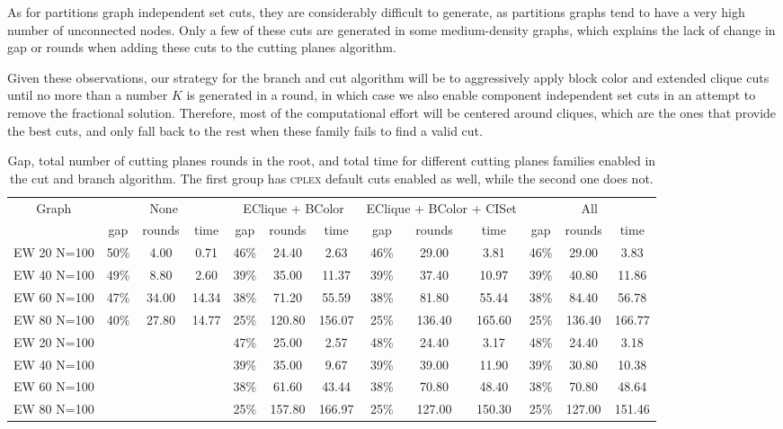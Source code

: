 As for partitions graph independent set cuts, they are considerably difficult to generate, as partitions graphs tend to have a very high number of unconnected nodes. Only a few of these cuts are generated in some medium-density graphs, which explains the lack of change in gap or rounds when adding these cuts to the cutting planes algorithm.

Given these observations, our strategy for the branch and cut algorithm will be to aggressively apply block color and extended clique cuts until no more than a number $K$ is generated in a round, in which case we also enable component independent set cuts in an attempt to remove the fractional solution. Therefore, most of the computational effort will be centered around cliques, which are the ones that provide the best cuts, and only fall back to the rest when these family fails to find a valid cut.

\begin{sidewaystable}[h]
\centering

\begin{tabular}{|c|ccc|ccc|ccc|ccc|}
\hline
\multicolumn{1}{|c|}{Graph} & \multicolumn{3}{|c|}{None} & \multicolumn{3}{|c|}{EClique + BColor} & \multicolumn{3}{|c|}{EClique + BColor + CISet} & \multicolumn{3}{|c|}{All}
\\
 & gap & rounds & time & gap & rounds & time & gap & rounds & time & gap & rounds & time
\\
\hline
EW 20 N=100 & 50\% & 4.00 & 0.71 & 46\% & 24.40 & 2.63 & 46\% & 29.00 & 3.81 & 46\% & 29.00 & 3.83
\\
EW 40 N=100 & 49\% & 8.80 & 2.60 & 39\% & 35.00 & 11.37 & 39\% & 37.40 & 10.97 &39\% & 40.80 & 11.86
\\
EW 60 N=100 &47\% & 34.00 & 14.34 &38\% & 71.20 & 55.59 &38\% & 81.80 & 55.44 &38\% & 84.40 & 56.78
\\
EW 80 N=100 &40\% & 27.80 & 14.77 &25\% & 120.80 & 156.07 &25\% & 136.40 & 165.60 &25\% & 136.40 & 166.77
\\
\hline 
EW 20 N=100 & & & &47\% & 25.00 & 2.57 &48\% & 24.40 & 3.17 &48\% & 24.40 & 3.18
\\
EW 40 N=100 & & & &39\% & 35.00 & 9.67 &39\% & 39.00 & 11.90 &39\% & 30.80 & 10.38
\\
EW 60 N=100 & & & &38\% & 61.60 & 43.44 &38\% & 70.80 & 48.40 &38\% & 70.80 & 48.64
\\
EW 80 N=100 & & & &25\% & 157.80 & 166.97 &25\% & 127.00 & 150.30 &25\% & 127.00 & 151.46
\\
\hline
 \end{tabular}

\caption{Gap, total number of cutting planes rounds in the root, and total time for different cutting planes families enabled in the cut and branch algorithm. The first group has \textsc{cplex} default cuts enabled as well, while the second one does not.}
\label{table:cuts:times}

\end{sidewaystable}

